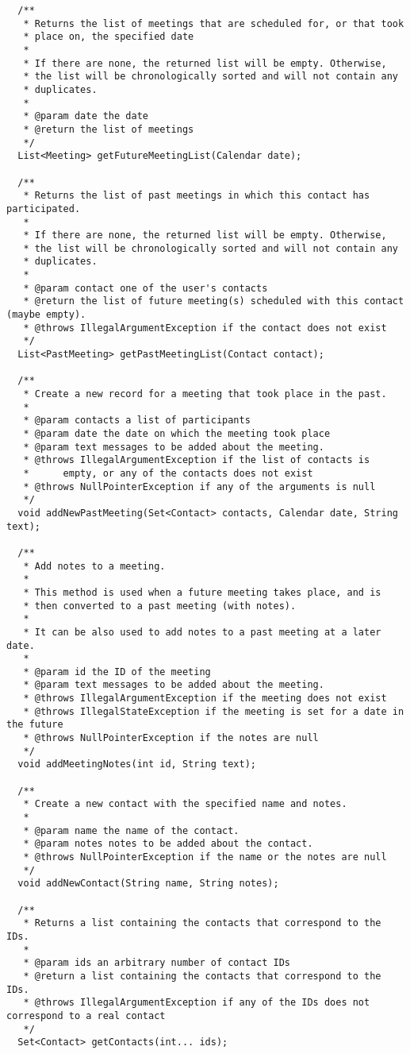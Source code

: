 \documentclass{article}
\begin{document}
\begin{verbatim}
  /**
   * Returns the list of meetings that are scheduled for, or that took
   * place on, the specified date
   * 
   * If there are none, the returned list will be empty. Otherwise,
   * the list will be chronologically sorted and will not contain any
   * duplicates. 
   * 
   * @param date the date
   * @return the list of meetings
   */
  List<Meeting> getFutureMeetingList(Calendar date);

  /**
   * Returns the list of past meetings in which this contact has participated.
   * 
   * If there are none, the returned list will be empty. Otherwise,
   * the list will be chronologically sorted and will not contain any
   * duplicates. 
   * 
   * @param contact one of the user's contacts
   * @return the list of future meeting(s) scheduled with this contact (maybe empty).
   * @throws IllegalArgumentException if the contact does not exist
   */
  List<PastMeeting> getPastMeetingList(Contact contact);

  /**
   * Create a new record for a meeting that took place in the past.
   *
   * @param contacts a list of participants
   * @param date the date on which the meeting took place
   * @param text messages to be added about the meeting. 
   * @throws IllegalArgumentException if the list of contacts is
   *      empty, or any of the contacts does not exist
   * @throws NullPointerException if any of the arguments is null
   */
  void addNewPastMeeting(Set<Contact> contacts, Calendar date, String text);

  /**
   * Add notes to a meeting. 
   * 
   * This method is used when a future meeting takes place, and is
   * then converted to a past meeting (with notes). 
   * 
   * It can be also used to add notes to a past meeting at a later date.
   * 
   * @param id the ID of the meeting
   * @param text messages to be added about the meeting.  
   * @throws IllegalArgumentException if the meeting does not exist
   * @throws IllegalStateException if the meeting is set for a date in the future
   * @throws NullPointerException if the notes are null
   */
  void addMeetingNotes(int id, String text);

  /**
   * Create a new contact with the specified name and notes.
   * 
   * @param name the name of the contact.
   * @param notes notes to be added about the contact.   
   * @throws NullPointerException if the name or the notes are null
   */
  void addNewContact(String name, String notes);

  /**
   * Returns a list containing the contacts that correspond to the IDs.
   *
   * @param ids an arbitrary number of contact IDs
   * @return a list containing the contacts that correspond to the IDs.
   * @throws IllegalArgumentException if any of the IDs does not correspond to a real contact
   */
  Set<Contact> getContacts(int... ids);


\end{verbatim}
\end{document}
